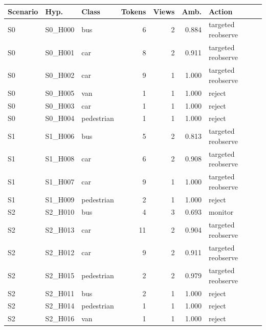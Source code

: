 \begin{tabular}{lllrrrl}
\toprule
Scenario & Hyp. & Class & Tokens & Views & Amb. & Action \\
\midrule
S0 & S0\_H000 & bus & 6 & 2 & 0.884 & targeted reobserve \\
S0 & S0\_H001 & car & 8 & 2 & 0.911 & targeted reobserve \\
S0 & S0\_H002 & car & 9 & 1 & 1.000 & targeted reobserve \\
S0 & S0\_H005 & van & 1 & 1 & 1.000 & reject \\
S0 & S0\_H003 & car & 1 & 1 & 1.000 & reject \\
S0 & S0\_H004 & pedestrian & 1 & 1 & 1.000 & reject \\
S1 & S1\_H006 & bus & 5 & 2 & 0.813 & targeted reobserve \\
S1 & S1\_H008 & car & 6 & 2 & 0.908 & targeted reobserve \\
S1 & S1\_H007 & car & 9 & 1 & 1.000 & targeted reobserve \\
S1 & S1\_H009 & pedestrian & 2 & 1 & 1.000 & reject \\
S2 & S2\_H010 & bus & 4 & 3 & 0.693 & monitor \\
S2 & S2\_H013 & car & 11 & 2 & 0.904 & targeted reobserve \\
S2 & S2\_H012 & car & 9 & 2 & 0.911 & targeted reobserve \\
S2 & S2\_H015 & pedestrian & 2 & 2 & 0.979 & targeted reobserve \\
S2 & S2\_H011 & bus & 2 & 1 & 1.000 & reject \\
S2 & S2\_H014 & pedestrian & 1 & 1 & 1.000 & reject \\
S2 & S2\_H016 & van & 1 & 1 & 1.000 & reject \\
\bottomrule
\end{tabular}
